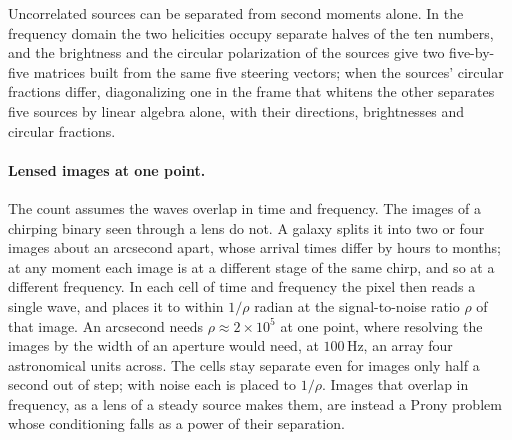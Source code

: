 Uncorrelated sources can be separated from second moments alone. In the
frequency domain the two helicities occupy separate halves of the ten numbers,
and the brightness and the circular polarization of the sources give two
five-by-five matrices built from the same five steering vectors; when the
sources' circular fractions differ, diagonalizing one in the frame that whitens
the other separates five sources by linear algebra alone, with their directions,
brightnesses and circular fractions.

\paragraph{Lensed images at one point.} The count assumes the waves overlap in
time and frequency. The images of a chirping binary seen through a lens do
not. A galaxy splits it into two or four images about an arcsecond apart,
whose arrival times differ by hours to months; at any moment each image is at
a different stage of the same chirp, and so at a different frequency. In each
cell of time and frequency the pixel then reads a single wave, and places it to
within $1/\rho$ radian at the signal-to-noise ratio $\rho$ of that image. An
arcsecond needs $\rho \approx 2\times10^5$ at one point, where resolving the
images by the width of an aperture would need, at $100\,\mathrm{Hz}$, an array
four astronomical units across. The cells stay separate even for images only
half a second out of step; with noise each is placed to $1/\rho$. Images that overlap in frequency, as a lens of a steady
source makes them, are instead a Prony problem whose conditioning falls as a
power of their separation.

